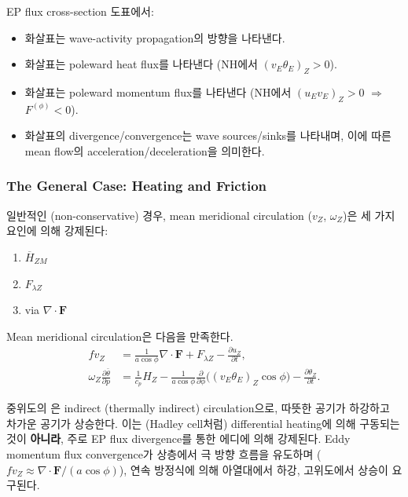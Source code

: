 \begin{remark}
EP flux cross-section 도표에서:
\begin{itemize}
  \item 화살표는 wave-activity propagation의 방향을 나타낸다.
  \item {} 화살표는 poleward heat flux를 나타낸다
    (NH에서 $(v_E\theta_E)_Z > 0$).
  \item {} 화살표는 poleward momentum flux를 나타낸다
    (NH에서 $(u_E v_E)_Z > 0$ $\Rightarrow$ $F^{(\phi)} < 0$).
  \item 화살표의 divergence/convergence는 wave sources/sinks를 나타내며,
    이에 따른 mean flow의 acceleration/deceleration을 의미한다.
\end{itemize}
\end{remark}

\subsubsection{The General Case: Heating and Friction}

일반적인 (non-conservative) 경우, mean meridional circulation
($v_Z$, $\omega_Z$)은 세 가지 요인에 의해 강제된다:

\begin{enumerate}
  \item {} $\overline{H}_{ZM}$
  \item {} $F_{\lambda Z}$
  \item {} via $\nabla\cdot\mathbf{F}$
\end{enumerate}

\noindent
Mean meridional circulation은 다음을 만족한다.
\begin{align}
  fv_Z &= \frac{1}{a\cos\phi}\nabla\cdot\mathbf{F}
    + F_{\lambda Z} - \frac{\partial u_Z}{\partial t},
  \label{eq:gen_vmean}\\[4pt]
  \omega_Z\frac{\partial\bar{\theta}}{\partial p}
    &= \frac{1}{c_p}H_Z
    - \frac{1}{a\cos\phi}\frac{\partial}{\partial\phi}
      \bigl((v_E\theta_E)_Z\cos\phi\bigr)
    - \frac{\partial\theta_Z}{\partial t}.
  \label{eq:gen_omegamean}
\end{align}

\begin{remark}
중위도의 은 indirect (thermally indirect) circulation으로,
따뜻한 공기가 하강하고 차가운 공기가 상승한다.  이는 (Hadley cell처럼)
differential heating에 의해 구동되는 것이 \textbf{아니라}, 주로 EP flux divergence를
통한 에디에 의해 강제된다.
Eddy momentum flux convergence가 상층에서 극 방향 흐름을 유도하며
($fv_Z \approx \nabla\cdot\mathbf{F}/(a\cos\phi)$), 연속 방정식에 의해
아열대에서 하강, 고위도에서 상승이 요구된다.
\end{remark}

